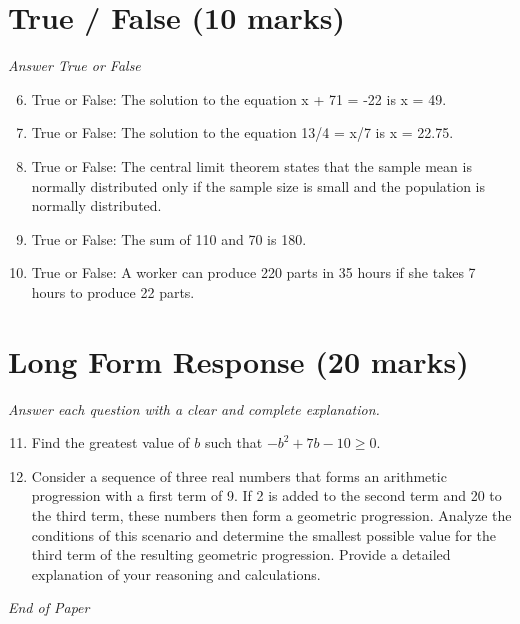 \documentclass[12pt]{article}
\begin{document}
\section*{True / False (10 marks)}
\textit{Answer True or False}
\begin{enumerate}[label=\arabic*.]
\setcounter{enumi}{5}
\item True or False: The solution to the equation x + 71 = -22 is x = 49.
\item True or False: The solution to the equation 13/4 = x/7 is x = 22.75.
\item True or False: The central limit theorem states that the sample mean is normally distributed only if the sample size is small and the population is normally distributed.
\item True or False: The sum of 110 and 70 is 180.
\item True or False: A worker can produce 220 parts in 35 hours if she takes 7 hours to produce 22 parts.
\end{enumerate}

\section*{Long Form Response (20 marks)}
\textit{Answer each question with a clear and complete explanation.}
\begin{enumerate}[label=\arabic*.]
\setcounter{enumi}{10}
\item Find the greatest value of $b$ such that $-b^2+7 b-10 \ge 0$.
\item Consider a sequence of three real numbers that forms an arithmetic progression with a first term of 9. If 2 is added to the second term and 20 to the third term, these numbers then form a geometric progression. Analyze the conditions of this scenario and determine the smallest possible value for the third term of the resulting geometric progression. Provide a detailed explanation of your reasoning and calculations.
\end{enumerate}

\vfill
\noindent\textit{End of Paper}
\end{document}
